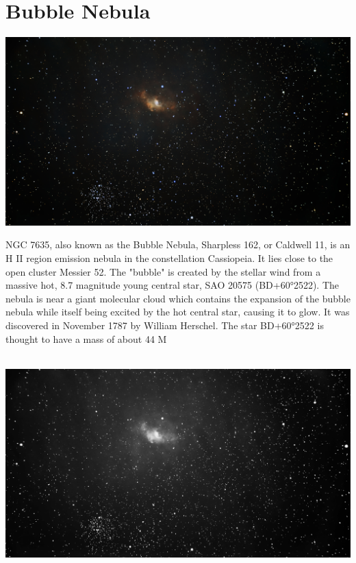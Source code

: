 \ \\\section{Bubble Nebula}
\includegraphics[width=\textwidth]{../Imaging//Original/Bubble_Nebula.jpg}
{\footnotesize\color{white}
NGC 7635, also known as the Bubble Nebula, Sharpless 162, or Caldwell 11, is an H II region emission nebula in the constellation Cassiopeia. It lies close to the open cluster Messier 52. The "bubble" is created by the stellar wind from a massive hot, 8.7 magnitude young central star, SAO 20575 (BD+60°2522). The nebula is near a giant molecular cloud which contains the expansion of the bubble nebula while itself being excited by the hot central star, causing it to glow. It was discovered in November 1787 by William Herschel. The star BD+60°2522 is thought to have a mass of about 44 M


}\ \\
\includegraphics[width=\textwidth]{../Imaging//Grayscale/Bubble_Nebula.jpg}
